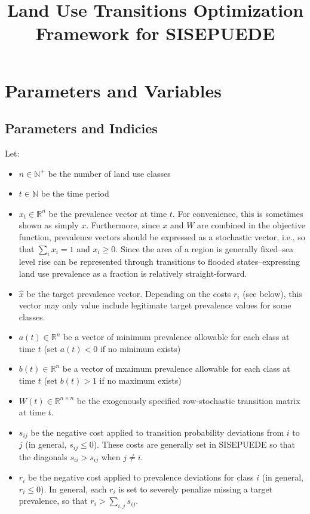 \documentclass[10pt]{article}
\title{Land Use Transitions Optimization Framework for SISEPUEDE}
\begin{document}
\maketitle


%
% 

\section*{Parameters and Variables}

\subsection*{Parameters and Indicies}

Let:
\begin{itemize}
\item
$n \in \mathbb{N}^+$ be the number of land use classes

\item
$t \in \mathbb{N}$ be the time period

\item
$x_t \in \mathbb{R}^n$ be the prevalence vector at time $t$. For convenience, this is sometimes shown as simply $x$. Furthermore, since $x$ and $W$ are combined in the objective function, prevalence vectors should be expressed as a stochastic vector, i.e., so that $\sum_i x_i = 1$ and $x_i \geq 0$. Since the area of a region is generally fixed--sea level rise can be represented through transitions to flooded states--expressing land use prevalence as a fraction is relatively straight-forward.

\item
$\hat{x}$ be the target prevalence vector. Depending on the costs $r_i$ (see below), this vector may only value include legitimate target prevalence values for some classes.
 
\item
$a(t) \in \mathbb{R}^n$ be a vector of minimum prevalence allowable for each class at time $t$ (set $a(t) < 0$ if no minimum exists) 

\item
$b(t) \in \mathbb{R}^n$ be a vector of mxaimum prevalence allowable for each class at time $t$ (set $b(t) > 1$ if no maximum exists) 

\item
$W(t) \in \mathbb{R}^{n \times n}$ be the exogenously specified row-stochastic transition matrix at time $t$.

\item 
$s_{ij}$ be the negative cost applied to transition probability deviations from $i$ to $j$ (in general, $s_{ij} \leq 0$). These costs are generally set in SISEPUEDE so that the diagonals $s_{ii} > s_{ij}$ when $j \not= i$.

\item 
$r_i$ be the negative cost applied to prevalence deviations for class $i$ (in general, $r_i \leq 0$). In general, each $r_i$ is set to severely penalize missing a target prevalence, so that $r_i > \sum_{i, j} s_{ij}$. 

\end{itemize}
\end{document}
